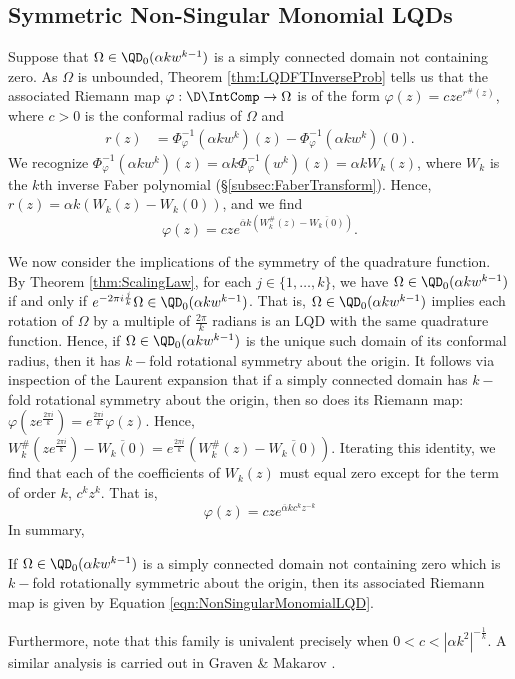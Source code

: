 \documentclass{article}
\numberwithin{equation}{section}
\begin{document}
\subsection{Symmetric Non-Singular Monomial LQDs}
Suppose that $\Omega\in\QD_0(\alpha k w^{k-1})$ is a simply connected domain not containing zero. As $\Omega$ is unbounded, Theorem \ref{thm:LQDFTInverseProb} tells us that the associated Riemann map $\varphi:\D\IntComp\rightarrow\Omega$ is of the form $\varphi(z)=cze^{r^{\#}(z)}$, where $c>0$ is the conformal radius of $\Omega$ and
\begin{align*}
    r(z)&=\Phi_{\varphi}^{-1}\left(\alpha k w^{k}\right)(z)-\Phi_{\varphi}^{-1}\left(\alpha k w^{k}\right)(0).
\end{align*}
We recognize $\Phi_{\varphi}^{-1}\left(\alpha k w^{k}\right)(z)=\alpha k \Phi_{\varphi}^{-1}\left(w^{k}\right)(z)=\alpha k W_k(z)$, where $W_k$ is the $k$th inverse Faber polynomial (\S\ref{subsec:FaberTransform}). Hence, $r(z)=\alpha k\left(W_k(z)-W_k(0)\right)$, and we find
$$\varphi(z)=cze^{\overline{\alpha}k\left(W_k^{\#}(z)-\overline{W_k(0)}\right)}.$$

We now consider the implications of the symmetry of the quadrature function. By Theorem \ref{thm:ScalingLaw}, for each $j\in\{1,\hdots,k\}$, we have $\Omega\in\QD_0(\alpha k w^{k-1})$ if and only if $e^{-2\pi i\frac{j}{k}}\Omega\in\QD_0(\alpha k w^{k-1})$. That is, $\Omega\in\QD_0(\alpha kw^{k-1})$ implies each rotation of $\Omega$ by a multiple of $\frac{2\pi}{k}$ radians is an LQD with the same quadrature function. Hence, if $\Omega\in\QD_0(\alpha kw^{k-1})$ is the unique such domain of its conformal radius, then it has $k-$fold rotational symmetry about the origin. It follows via inspection of the Laurent expansion that if a simply connected domain has $k-$fold rotational symmetry about the origin, then so does its Riemann map: $\varphi\left(ze^{\frac{2\pi i}{k}}\right)=e^{\frac{2\pi i}{k}}\varphi\left(z\right)$. Hence, $W_k^{\#}\left(ze^{\frac{2\pi i}{k}}\right)-\overline{W_k(0)}=e^{\frac{2\pi i}{k}}\left(W_k^{\#}(z)-\overline{W_k(0)}\right)$. Iterating this identity, we find that each of the coefficients of $W_k(z)$ must equal zero except for the term of order $k$, $c^kz^k$. That is,
\begin{equation}\label{eqn:NonSingularMonomialLQD}
    \varphi(z)=cze^{\overline{\alpha}kc^kz^{-k}}
\end{equation}
In summary,
\begin{theorem}\label{thm:NonSingularMonomialLQD}
    If $\Omega\in\QD_0(\alpha k w^{k-1})$ is a simply connected domain not containing zero which is $k-$fold rotationally symmetric about the origin, then its associated Riemann map is given by Equation \ref{eqn:NonSingularMonomialLQD}.
\end{theorem}
Furthermore, note that this family is univalent precisely when $0<c<|\alpha k^2|^{-\frac{1}{k}}$. A similar analysis is carried out in Graven \& Makarov \cite{GravenMakarov2025}.
\end{document}
